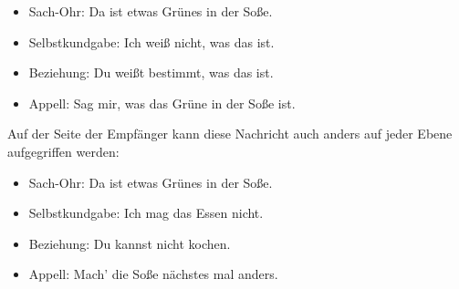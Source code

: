 \documentclass[a4paper]{article}
\begin{document}
\begin{itemize}
    \item Sach-Ohr: Da ist etwas Grünes in der Soße.
    \item Selbstkundgabe: Ich weiß nicht, was das ist.
    \item Beziehung: Du weißt bestimmt, was das ist.
    \item Appell: Sag mir, was das Grüne in der Soße ist.\\
    
\end{itemize}
Auf der Seite der Empfänger kann diese Nachricht auch anders auf jeder Ebene aufgegriffen werden:
\newpage
\begin{itemize}
    \item Sach-Ohr: Da ist etwas Grünes in der Soße.
    \item Selbstkundgabe: Ich mag das Essen nicht.
    \item Beziehung: Du kannst nicht kochen.
    \item Appell: Mach' die Soße nächstes mal anders.\\\\\\
    
\end{itemize}
\end{document}
